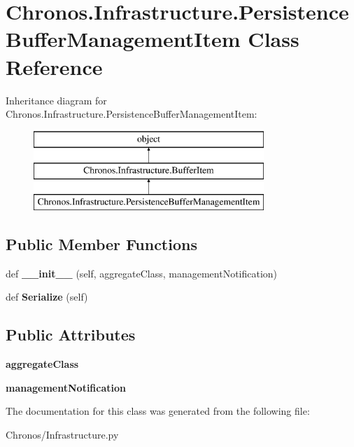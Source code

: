 \hypertarget{classChronos_1_1Infrastructure_1_1PersistenceBufferManagementItem}{}\section{Chronos.\+Infrastructure.\+Persistence\+Buffer\+Management\+Item Class Reference}
\label{classChronos_1_1Infrastructure_1_1PersistenceBufferManagementItem}
Inheritance diagram for Chronos.\+Infrastructure.\+Persistence\+Buffer\+Management\+Item\+:\begin{figure}[H]
\begin{center}
\leavevmode
\includegraphics[height=3.000000cm]{classChronos_1_1Infrastructure_1_1PersistenceBufferManagementItem}
\end{center}
\end{figure}
\subsection*{Public Member Functions}
\begin{DoxyCompactItemize}
\item 
def {\bfseries \+\_\+\+\_\+init\+\_\+\+\_\+} (self, aggregate\+Class, management\+Notification)
\item 
def {\bfseries Serialize} (self)
\end{DoxyCompactItemize}
\subsection*{Public Attributes}
\begin{DoxyCompactItemize}
\item 
{\bfseries aggregate\+Class}
\item 
{\bfseries management\+Notification}
\end{DoxyCompactItemize}


The documentation for this class was generated from the following file\+:\begin{DoxyCompactItemize}
\item 
Chronos/Infrastructure.\+py\end{DoxyCompactItemize}
